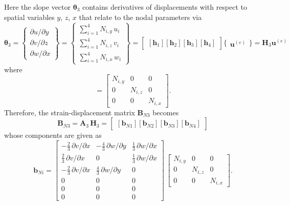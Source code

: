 Here the slope vector $\boldsymbol{\theta}_3$ contains derivatives of displacements with respect to spatial variables $y$, $z$, $x$ that relate to the nodal parameters via
\begin{equation}
\boldsymbol{\theta}_3 =  \begin{Bmatrix}
\partial u / \partial y\\
\partial v / \partial z \\
\partial w / \partial x
\end{Bmatrix}
= \begin{Bmatrix}
\sum\nolimits_{i=1}^4 N_{i,y} \, u_i\\
\sum\nolimits_{i=1}^4 N_{i,z} \, v_i \\
\sum\nolimits_{i=1}^4 N_{i,x} \, w_i
\end{Bmatrix} 
= \begin{bmatrix}
[\mathbf{h}_1] [\mathbf{h}_2] [\mathbf{h}_3] [\mathbf{h}_4] 
\end{bmatrix} \bigl\{ \begin{matrix} \mathbf{u}^{(e)} \end{matrix} \bigr\}
= \mathbf{H}_3 \mathbf{u}^{(e)}
\end{equation}
where 
\begin{equation}
[\mathbf{h}_i] = \begin{bmatrix}
N_{i,y} &  0 & 0  \\
0 & N_{i,z} & 0  \\
0 & 0 & N_{i,x} \end{bmatrix}. 
\end{equation}
Therefore, the strain-displacement matrix $\mathbf{B}_{N3}$ becomes
\begin{equation}
\mathbf{B}_{N3} = \mathbf{A}_3 \, \mathbf{H}_3 = \begin{bmatrix}
[\mathbf{b}_{N1}] [\mathbf{b}_{N2}] [\mathbf{b}_{N3}] [\mathbf{b}_{N4}]
\end{bmatrix} 
\end{equation}
whose components are given as
\begin{equation}
\mathbf{b}_{Ni} = \begin{bmatrix}
	- \tfrac{2}{3} \, \partial v / \partial x &  - \tfrac{4}{3} \, \partial w / \partial y &  \tfrac{1}{3} \, \partial w / \partial x   \\
	\tfrac{2}{3} \, \partial v / \partial x &  0 & \tfrac{1}{3} \, \partial w / \partial x  \\
	- \tfrac{2}{3} \, \partial v / \partial x & \tfrac{4}{3} \, \partial w / \partial y & 0 \\
	0 &  0 & 0  \\
	0 &  0 & 0  \\
	0 &  0 & 0  \end{bmatrix} \, \begin{bmatrix}
N_{i,y} &  0 & 0  \\
0 & N_{i,z} & 0  \\
0 & 0 & N_{i,x}  \end{bmatrix}.
\end{equation}


